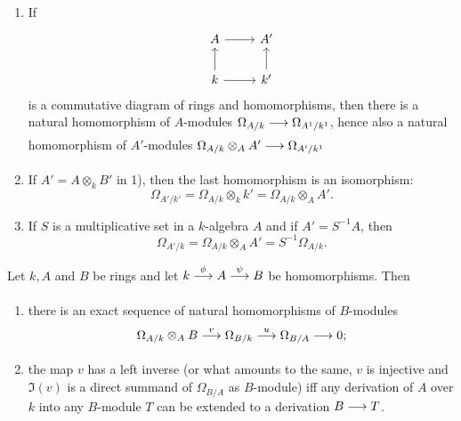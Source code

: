 \documentclass[../main]{subfiles}
\begin{document}
\begin{exercise}
\begin{enumerate}[label = \arabic*)]
    \item\label{exe:26.01} If \[\begin{tikzcd}A \arrow[r] &A' \\ k \arrow[u] \arrow[r] &k'\arrow[u] \end{tikzcd}\] is a commutative diagram of rings and homomorphisms, then there is a natural homomorphism of $A$-modules $\Omega_{A / k} \varrightarrow{} \Omega_{A^1 / k^1}$, hence also a natural homomorphism of $A'$-modules $\Omega_{A / k} \otimes_AA' \varrightarrow{} \Omega_{A' / k^1}$

    \item\label{exe:26.02} If $A'=A\otimes_k B'$ in 1), then the last homomorphism is an isomorphism: \[\Omega_{A' / k'}=\Omega_{A / k} \otimes_k k'=\Omega_{A / k} \otimes_A A'.\]

    \item\label{exe:26.03} If $S$ is a multiplicative set in a $k$-algebra $A$ and if $A'=S^{-1} A$, then \[\Omega_{A' / k}=\Omega_{A / k} \otimes_A A'=S^{-1} \Omega_{A / k}.\]
\end{enumerate}
\end{exercise}

\begin{partheorem}\label{thm:057}
Let $k, A$ and $B$ be rings and let $k \varrightarrow{\phi} A \varrightarrow{\psi} B$ be homomorphisms. Then
\begin{enumerate}
    \item there is an exact sequence of natural homomorphisms of $B$-modules \[\Omega_{A / k} \otimes_A B\varrightarrow{v} \Omega_{B / k} \varrightarrow{u} \Omega_{B / A} \varrightarrow{} 0 ;\]
    
    \item the map $v$ has a left inverse (or what amounts to the same, $v$ is injective and $\Im(v)$ is a direct summand of $\Omega_{B / A}$ as $B$-module) iff any derivation of $A$ over $k$ into any $B$-module $T$ can be extended to a derivation $B \varrightarrow{} T$.
\end{enumerate}
\end{partheorem}
\end{document}
